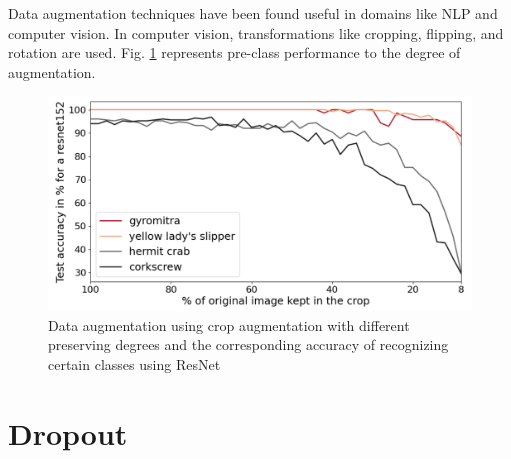 Data augmentation techniques have been found useful in domains like NLP and computer vision. In computer vision, transformations like cropping, flipping, and rotation are used. Fig. \ref{fig:DADeg} represents pre-class performance to the degree of augmentation.
\begin{figure}
    \begin{center}
        \includegraphics[width=\textwidth]{Figures/labelpreserveAug.png}
        \caption{\label{fig:DADeg}Data augmentation using crop augmentation with different preserving degrees and the corresponding accuracy of recognizing certain classes using ResNet}
    \end{center}
\end{figure}


\section{Dropout}


